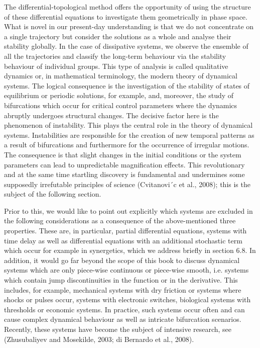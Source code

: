 \documentclass[12pt]{article}
\begin{document}
The differential-topological method offers the opportunity of using the structure of
these differential equations to investigate them geometrically in phase space. What
is novel in our present-day understanding is that we do not concentrate on a single
trajectory but consider the solutions as a whole and analyse their stability globally.
In the case of dissipative systems, we observe the ensemble of all the trajectories
and classify the long-term behaviour via the stability behaviour of individual
groups. This type of analysis is called qualitative dynamics or, in mathematical
terminology, the modern theory of dynamical systems. The logical consequence is
the investigation of the stability of states of equilibrium or periodic solutions, for
example, and, moreover, the study of bifurcations which occur for critical control
parameters where the dynamics abruptly undergoes structural changes. The decisive
factor here is the phenomenon of instability. This plays the central role in the
theory of dynamical systems. Instabilities are responsible for the creation of new
temporal patterns as a result of bifurcations and furthermore for the occurrence of
irregular motions. The consequence is that slight changes in the initial conditions
or the system parameters can lead to unpredictable magnification effects. This revolutionary
and at the same time startling discovery is fundamental and undermines
some supposedly irrefutable principles of science (Cvitanovi´c et al., 2008); this is
the subject of the following section.

\hfill

Prior to this, we would like to point out explicitly which systems are excluded in the
following considerations as a consequence of the above-mentioned three properties.
These are, in particular, partial differential equations, systems with time delay
as well as differential equations with an additional stochastic term which occur
for example in synergetics, which we address briefly in section 6.8. In addition, it
would go far beyond the scope of this book to discuss dynamical systems which
are only piece-wise continuous or piece-wise smooth, i.e. systems which contain
jump discontinuities in the function or in the derivative. This includes, for example,
mechanical systems with dry friction or systems where shocks or pulses occur,
systems with electronic switches, biological systems with thresholds or economic
systems. In practice, such systems occur often and can cause complex dynamical
behaviour as well as intricate bifurcation scenarios. Recently, these systems have
become the subject of intensive research, see (Zhusubaliyev and Mosekilde, 2003;
di Bernardo et al., 2008).
\end{document}
